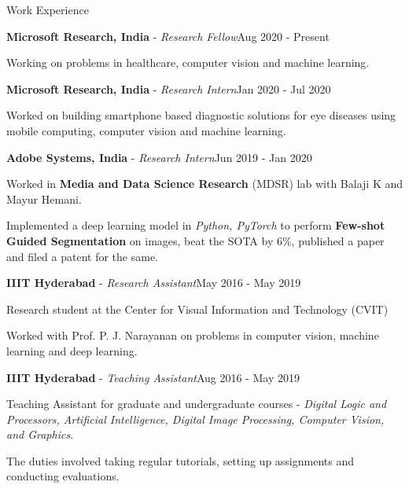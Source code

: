 \documentclass{resume} %
\begin{document}
\begin{rSection}{Work Experience}


\begin{rSubsection}{\textbf{Microsoft Research, India} - \textit{Research Fellow}}{Aug 2020 - Present}{}{}
\item Working on problems in healthcare, computer vision and machine learning.
\end{rSubsection}

\begin{rSubsection}{\textbf{Microsoft Research, India} - \textit{Research Intern}}{Jan 2020 - Jul 2020}{}{}
\item Worked on building smartphone based diagnostic solutions for eye diseases using mobile computing, computer vision and machine learning.
\end{rSubsection}

\begin{rSubsection}{\textbf{Adobe Systems, India} - \textit{Research Intern}}{Jun 2019 - Jan 2020}{}{}
\item Worked in \textbf{Media and Data Science Research} (MDSR) lab with Balaji K and Mayur Hemani. 
\item Implemented a deep learning model in \textit{Python, PyTorch} to perform \textbf{Few-shot Guided Segmentation} on images, beat the SOTA by 6\%, published a paper and filed a patent for the same.
\end{rSubsection}

\begin{rSubsection}{\textbf{IIIT Hyderabad} - \textit{Research Assistant}}{May 2016 - May 2019}{}{}
\item Research student at the Center for Visual Information and Technology (CVIT)
\item Worked with Prof. P. J. Narayanan on problems in computer vision, machine learning and deep learning.
\end{rSubsection}

\begin{rSubsection}{\textbf{IIIT Hyderabad} - \textit{Teaching Assistant}}{Aug 2016 - May 2019}{}{}
\item Teaching Assistant for graduate and undergraduate courses - \textit{Digital Logic and Processors, Artificial Intelligence, Digital Image Processing, Computer Vision, and Graphics}.
\item The duties involved taking regular tutorials, setting up assignments and conducting evaluations.
\end{rSubsection}


\end{rSection}
\end{document}
